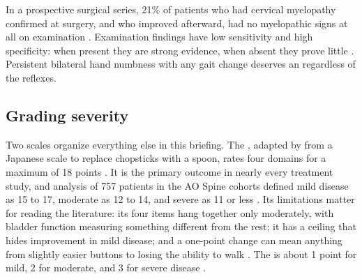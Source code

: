 \documentclass[11pt, letterpaper]{article}
\begin{document}
\begin{flag}
In a prospective surgical series, 21\% of patients who had cervical myelopathy confirmed at surgery, and who improved afterward, had no myelopathic signs at all on examination \citep{rhee2009}. Examination findings have low sensitivity and high specificity: when present they are strong evidence, when absent they prove little \citep{davies2018}. Persistent bilateral hand numbness with any gait change deserves an  regardless of the reflexes.
\end{flag}

\subsection*{Grading severity}

Two scales organize everything else in this briefing. The , adapted by \citet{benzel1991} from a Japanese scale to replace chopsticks with a spoon, rates four domains for a maximum of 18 points \citep{margetis2025}. It is the primary outcome in nearly every treatment study, and analysis of 757 patients in the AO Spine cohorts defined mild disease as 15 to 17, moderate as 12 to 14, and severe as 11 or less \citep{tetreault2017thresholds}. Its limitations matter for reading the literature: its four items hang together only moderately, with bladder function measuring something different from the rest; it has a ceiling that hides improvement in mild disease; and a one-point change can mean anything from slightly easier buttons to losing the ability to walk \citep{kopjar2015,tetreault2015mcid}. The  is about 1 point for mild, 2 for moderate, and 3 for severe disease \citep{tetreault2015mcid}.
\end{document}
